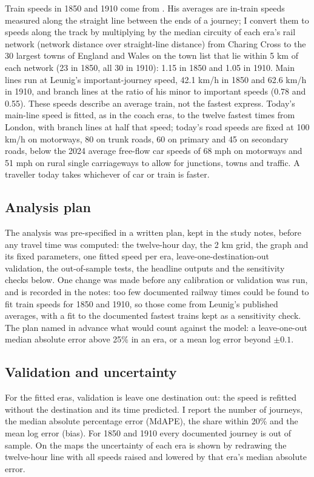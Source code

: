 \documentclass[11pt,a4paper]{article}
\begin{document}
Train speeds in 1850 and 1910 come from \citet[Table~2]{leunig2006}. His averages are in-train speeds measured along the straight line between the ends of a journey; I convert them to speeds along the track by multiplying by the median circuity of each era's rail network (network distance over straight-line distance) from Charing Cross to the 30 largest towns of England and Wales on the town list that lie within 5 km of each network (23 in 1850, all 30 in 1910): 1.15 in 1850 and 1.05 in 1910. Main lines run at Leunig's important-journey speed, 42.1 km/h in 1850 and 62.6 km/h in 1910, and branch lines at the ratio of his minor to important speeds (0.78 and 0.55). These speeds describe an average train, not the fastest express. Today's main-line speed is fitted, as in the coach eras, to the twelve fastest times from London, with branch lines at half that speed; today's road speeds are fixed at 100 km/h on motorways, 80 on trunk roads, 60 on primary and 45 on secondary roads, below the 2024 average free-flow car speeds of 68 mph on motorways and 51 mph on rural single carriageways \citep{dft2025} to allow for junctions, towns and traffic. A traveller today takes whichever of car or train is faster.

\subsection{Analysis plan}
The analysis was pre-specified in a written plan, kept in the study notes, before any travel time was computed: the twelve-hour day, the 2 km grid, the graph and its fixed parameters, one fitted speed per era, leave-one-destination-out validation, the out-of-sample tests, the headline outputs and the sensitivity checks below. One change was made before any calibration or validation was run, and is recorded in the notes: too few documented railway times could be found to fit train speeds for 1850 and 1910, so those come from Leunig's published averages, with a fit to the documented fastest trains kept as a sensitivity check. The plan named in advance what would count against the model: a leave-one-out median absolute error above 25\% in an era, or a mean log error beyond $\pm0.1$.

\subsection{Validation and uncertainty}
For the fitted eras, validation is leave one destination out: the speed is refitted without the destination and its time predicted. I report the number of journeys, the median absolute percentage error (MdAPE), the share within 20\% and the mean log error (bias). For 1850 and 1910 every documented journey is out of sample. On the maps the uncertainty of each era is shown by redrawing the twelve-hour line with all speeds raised and lowered by that era's median absolute error.
\end{document}
